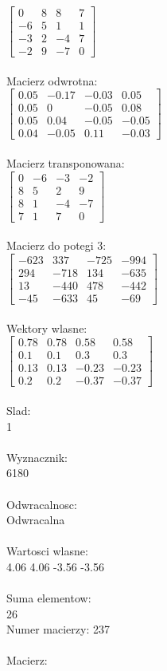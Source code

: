 \documentclass[a4paper,12pt]{article}
\begin{document}
$\begin{bmatrix} 0&8&8&7\\-6&5&1&1\\-3&2&-4&7\\-2&9&-7&0 \end{bmatrix}$
\\
\\
Macierz odwrotna:\\

$\begin{bmatrix} 0.05&-0.17&-0.03&0.05\\0.05&0&-0.05&0.08\\0.05&0.04&-0.05&-0.05\\0.04&-0.05&0.11&-0.03 \end{bmatrix}$
\\
\\
Macierz transponowana:\\

$\begin{bmatrix} 0&-6&-3&-2\\8&5&2&9\\8&1&-4&-7\\7&1&7&0 \end{bmatrix}$
\\
\\
Macierz do potegi 3:\\

$\begin{bmatrix} -623&337&-725&-994\\294&-718&134&-635\\13&-440&478&-442\\-45&-633&45&-69 \end{bmatrix}$
\\
\\
Wektory wlasne:\\

$\begin{bmatrix} 0.78&0.78&0.58&0.58\\0.1&0.1&0.3&0.3\\0.13&0.13&-0.23&-0.23\\0.2&0.2&-0.37&-0.37 \end{bmatrix}$
\\
\\
Slad:\\
1
\\
\\
Wyznacznik:\\
6180
\\
\\
Odwracalnosc:\\
Odwracalna
\\
\\
Wartosci wlasne:\\
4.06 4.06 -3.56 -3.56
\\
\\
Suma elementow:\\
26
\\
\newpage
Numer macierzy:
237
\\
\\
Macierz:\\
\end{document}
